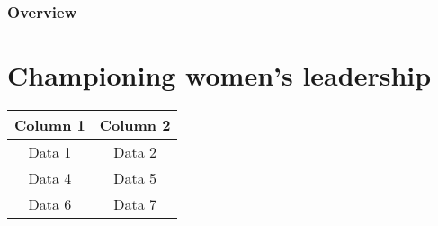 \documentclass[12pt]{article}
\begin{document}
\subsubsection{Overview}

\section{Championing women's leadership}





\begin{center}
\begin{tabular}{||c|c||}
\hline
\hline
\rowcolor[HTML]{89A8B2} Column 1 & Column 2 \\
\hline
\hline
\rowcolor[HTML]{F8FAFC} Data 1 & Data 2 \\ %
\hline

\rowcolor[HTML]{D8EFD3} Data 4 & Data 5 \\
\hline

\rowcolor[HTML]{F8FAFC} Data 6 & Data 7 \\ %
\hline
\hline
\end{tabular}
\end{center}
\bigskip %

\subsubsection{}
\end{document}
